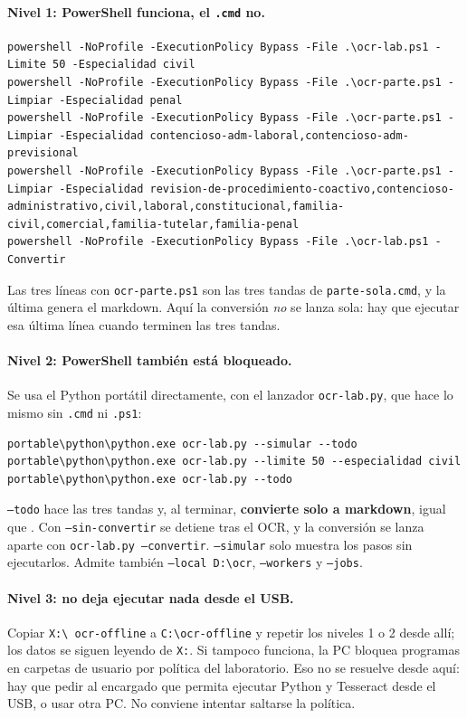 ﻿\documentclass[11pt,a4paper]{article}
\begin{document}
\paragraph{Nivel 1: PowerShell funciona, el \texttt{.cmd} no.}
\begin{lstlisting}
powershell -NoProfile -ExecutionPolicy Bypass -File .\ocr-lab.ps1 -Limite 50 -Especialidad civil
powershell -NoProfile -ExecutionPolicy Bypass -File .\ocr-parte.ps1 -Limpiar -Especialidad penal
powershell -NoProfile -ExecutionPolicy Bypass -File .\ocr-parte.ps1 -Limpiar -Especialidad contencioso-adm-laboral,contencioso-adm-previsional
powershell -NoProfile -ExecutionPolicy Bypass -File .\ocr-parte.ps1 -Limpiar -Especialidad revision-de-procedimiento-coactivo,contencioso-administrativo,civil,laboral,constitucional,familia-civil,comercial,familia-tutelar,familia-penal
powershell -NoProfile -ExecutionPolicy Bypass -File .\ocr-lab.ps1 -Convertir
\end{lstlisting}
Las tres líneas con \texttt{ocr-parte.ps1} son las tres tandas de \texttt{parte-sola.cmd},
y la última genera el markdown. Aquí la conversión \emph{no} se lanza sola: hay que ejecutar
esa última línea cuando terminen las tres tandas.

\paragraph{Nivel 2: PowerShell también está bloqueado.} Se usa el Python portátil
directamente, con el lanzador \texttt{ocr-lab.py}, que hace lo mismo sin \texttt{.cmd} ni
\texttt{.ps1}:
\begin{lstlisting}
portable\python\python.exe ocr-lab.py --simular --todo
portable\python\python.exe ocr-lab.py --limite 50 --especialidad civil
portable\python\python.exe ocr-lab.py --todo
\end{lstlisting}
\begin{sloppypar}
\texttt{--todo} hace las tres tandas y, al terminar, \textbf{convierte solo a markdown}, igual
que . Con \texttt{--sin-convertir} se detiene tras el OCR, y la
conversión se lanza aparte con \texttt{ocr-lab.py --convertir}. \texttt{--simular} solo
muestra los pasos sin ejecutarlos. Admite también \texttt{--local D:\textbackslash ocr},
\texttt{--workers} y \texttt{--jobs}.
\end{sloppypar}

\paragraph{Nivel 3: no deja ejecutar nada desde el USB.} Copiar \texttt{X:\textbackslash
ocr-offline} a \texttt{C:\textbackslash ocr-offline} y repetir los niveles 1 o 2 desde
allí; los datos se siguen leyendo de \texttt{X:}. Si tampoco funciona, la PC bloquea
programas en carpetas de usuario por política del laboratorio. Eso no se resuelve desde
aquí: hay que pedir al encargado que permita ejecutar Python y Tesseract desde el USB, o
usar otra PC. No conviene intentar saltarse la política.
\end{document}
